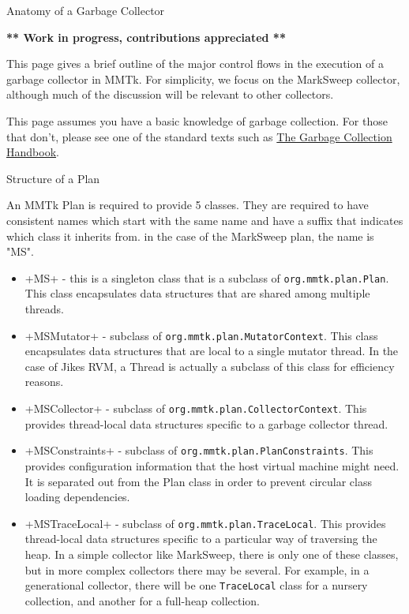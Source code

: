 \begin{section}{Anatomy of a Garbage Collector}
\label{sec:anatomyofagarbagecollector}

\textbf{** Work in progress, contributions appreciated **}
\newline

This page gives a brief outline of the major control flows in the execution of a garbage collector in MMTk.  For simplicity, we focus on the MarkSweep collector, although much of the discussion will be relevant to other collectors. 

This page assumes you have a basic knowledge of garbage collection. For those that don't, please see one of the standard texts such as \href{http://gchandbook.org/}{The Garbage Collection Handbook}.

\begin{subsection}{Structure of a Plan}

An MMTk Plan is required to provide 5 classes.  They are required to have consistent names which start with the same name and have a suffix that indicates which class it inherits from. in the case of the MarkSweep plan, the name is "MS".
\begin{itemize}
  \item \spverb+MS+ - this is a singleton class that is a subclass of \texttt{org.mmtk.plan.Plan}. This class encapsulates data structures that are shared among multiple threads.
  \item \spverb+MSMutator+ - subclass of \texttt{org.mmtk.plan.MutatorContext}.  This class encapsulates data structures that are local to a single mutator thread.  In the case of Jikes RVM, a Thread is actually a subclass of this class for efficiency reasons.
  \item \spverb+MSCollector+ - subclass of \texttt{org.mmtk.plan.CollectorContext}.  This provides thread-local data structures specific to a garbage collector thread.
  \item \spverb+MSConstraints+ - subclass of \texttt{org.mmtk.plan.PlanConstraints}.  This provides configuration information that the host virtual machine might need.  It is separated out from the Plan class in order to prevent circular class loading dependencies.
  \item \spverb+MSTraceLocal+ - subclass of \texttt{org.mmtk.plan.TraceLocal}.  This provides thread-local data structures specific to a particular way of traversing the heap. In a simple collector like MarkSweep, there is only one of these classes, but in more complex collectors there may be several. For example, in a generational collector, there will be one \texttt{TraceLocal} class for a nursery collection, and another for a full-heap collection.
\end{itemize}


\end{subsection}
\end{section}
